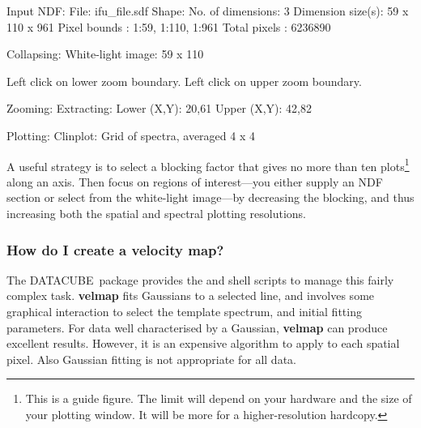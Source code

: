 \documentclass[twoside,11pt]{starlink}
\providecommand{\DATACUBE}{{\footnotesize DATACUBE}\normalsize}
\begin{document}
\begin{small}
\begin{terminalv}

     Input NDF:
       File: ifu_file.sdf
     Shape:
       No. of dimensions: 3
       Dimension size(s): 59 x 110 x 961
       Pixel bounds     : 1:59, 1:110, 1:961
       Total pixels     : 6236890

     Collapsing:
       White-light image: 59 x 110

 Left click on lower zoom boundary.
 Left click on upper zoom boundary.

      Zooming:
      Extracting:
        Lower (X,Y): 20,61
        Upper (X,Y): 42,82

      Plotting:
        Clinplot: Grid of spectra, averaged 4 x 4
\end{terminalv}
\end{small}


A useful strategy is to select a blocking factor that gives no more
than ten plots\footnote{This is a guide figure.  The limit will
depend on your hardware and the size of your plotting window.  It will
be more for a higher-resolution hardcopy.} along an axis.  Then focus
on regions of interest---you either supply an NDF section or select
from the white-light image---by decreasing the blocking, and thus
increasing both the spatial and spectral plotting resolutions.


\subsubsection{\label{sc16_velmap}How do I create a velocity map?}

The \DATACUBE\ package provides the  and 
shell scripts to manage this fairly complex task.  \textbf{velmap} fits
Gaussians to a selected line, and involves some graphical interaction
to select the template spectrum, and initial fitting parameters. For
data well characterised by a Gaussian, \textbf{velmap} can produce
excellent results.  However, it is an expensive algorithm to apply to
each spatial pixel.  Also Gaussian fitting is not appropriate for all
data.
\end{document}
